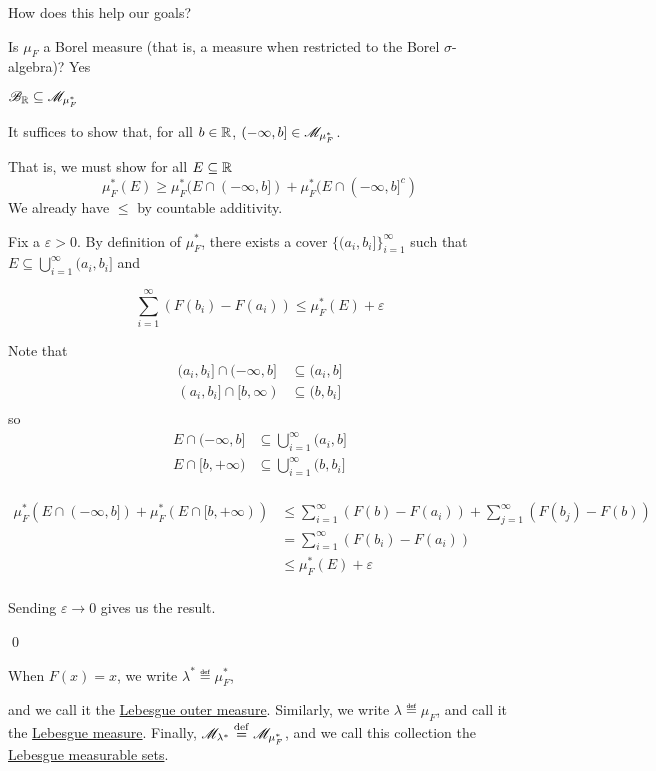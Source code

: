 \documentclass[x11names,reqno,14pt]{extarticle}
\newcommand*{\oo}{\infty}
\newcommand{\seq}[1]{_{#1 = 1}^\oo}
\begin{document}
How does this help our goals?

Is $\mu_F$ a Borel measure (that is, a measure when restricted to the Borel $\sigma$-algebra)? Yes

\thm

$\mathscr{B}_{\mathbb{R}} \subseteq\mathscr{M}_{\mu^*_F}$

\proof

It suffices to show that, for all $b \in \mathbb{R}$, $(-\oo, b] \in \ms{M}_{\mu^*_F}$. 

That is, we must show for all $E \subseteq \mathbb{R}$ 
\[
\mu^*_F(E)\geq \mu^*_F(E\cap(-\oo,b]) + \mu^*_F(E\cap(-\oo,b]^c)
\]
We already have $\leq$ by countable additivity. 

Fix a $\varepsilon>0$. By definition of $\mu^*_F$, there exists a cover $\{(a_i, b_i]\}\seq{i}$ such that $E\subseteq\bigcup\seq{i}(a_i, b_i]$ and

\[
\sum\seq{i}(F(b_i) - F(a_i)) \leq \mu^*_F(E) + \varepsilon
\]

Note that 
\begin{align*}
(a_i, b_i] \cap (-\oo, b] & \subseteq (a_i, b] \\
(a_i, b_i] \cap [b, \oo) & \subseteq (b, b_i] \\
\end{align*}
so
\begin{align*}
E\cap(-\oo,b] & \subseteq\bigcup\seq{i}(a_i, b] \\
E \cap [b, + \oo) & \subseteq \bigcup\seq{i}(b, b_i] \\
\end{align*}

\begin{align*}
\mu^*_F(E\cap(-\oo,b]) + \mu^*_F(E \cap [b, +\oo)) & \leq \sum\seq{i}(F(b) - F(a_i)) + \sum\seq{j}(F(b_j) - F(b)) \\
					& = \sum\seq{i}(F(b_i) - F(a_i)) \\
					& \leq \mu^*_F(E) + \varepsilon \\
\end{align*}

Sending $\varepsilon\to0$ gives us the result. 

\qed


When $F(x) = x$, we write $\lambda^* \eqdef\mu^*_F$, 

and we call it the \underline{Lebesgue outer measure}. Similarly, we write $\lambda \eqdef\mu_F$, and call it the \underline{Lebesgue measure}. Finally, $\mathscr{M}_{\lambda^*}\overset{\mathrm{def}}{=}\mathscr{M}_{\mu^*_F}$, and we call this collection the \underline{Lebesgue measurable sets}. 
\end{document}
